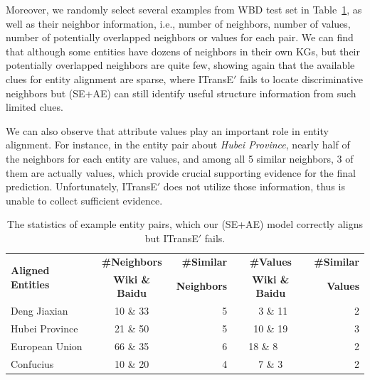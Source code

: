 Moreover, we randomly select several examples from WBD test set in Table~\ref{example},
as well as their neighbor information, i.e., number of neighbors, number of values, number of potentially overlapped neighbors or values for each pair.
We can find that although some entities have dozens of neighbors in their own KGs, but their potentially overlapped neighbors are quite few, showing again that
the available clues for entity alignment are sparse,
 where ITransE$'$ fails to locate discriminative neighbors but \HRGCN (SE+AE) can still identify useful structure information from such limited clues.

We can also observe that attribute values play an important role in entity alignment.
For instance, in the entity pair about \textit{Hubei Province}, nearly half of the neighbors for each entity are values, and among all 5 similar neighbors, 3 of them are actually values,
which provide crucial supporting evidence for the final prediction. Unfortunately, ITransE$'$ does not utilize those information, thus is unable to collect sufficient evidence.

\begin{table}
	\centering
	\scriptsize
	\begin{tabular}{lcrcr}
		\toprule
		\multirow{2}{*}{\bf Aligned Entities} & \bf \#Neighbors & \bf \#Similar & \bf \#Values & \bf \#Similar \\
		&\bf  Wiki \& Baidu &\bf  Neighbors &\bf  Wiki \& Baidu &\bf  Values \\
		\midrule
		Deng Jiaxian & 10 \& 33 & 5 & \ 3 \& 11 & 2\\
		Hubei Province & 21 \& 50 & 5 & 10 \& 19 & 3\\
		European Union & 66 \& 35 & 6 & 18 \& 8\ \ \ & 2\\
		Confucius & 10 \& 20 & 4 & 7 \& 3 & 2\\
		\bottomrule
	\end{tabular}
	\caption{The statistics of example entity pairs, which our \HRGCN(SE+AE) model correctly aligns but ITransE$'$ fails.}
	\label{example}
\end{table}


